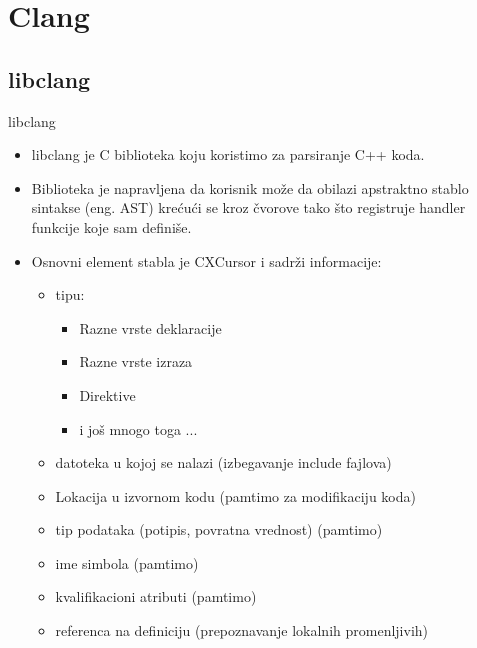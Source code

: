 \documentclass{beamer}
\begin{document}
\section{Clang}

\subsection{libclang}

\begin{frame}{libclang}

\begin{itemize}
  \item { libclang je C biblioteka koju koristimo za parsiranje C++
      koda.
  }
  \item { Biblioteka je napravljena da korisnik može da obilazi
    apstraktno stablo sintakse (eng. AST) krećući se kroz čvorove
    tako što registruje handler funkcije koje sam definiše.
  }
  \item { Osnovni element stabla je CXCursor i sadrži informacije:
      \begin{itemize}
        \item { tipu:
            \begin{itemize}
              \item {Razne vrste deklaracije}
              \item {Razne vrste  izraza}
              \item {Direktive}
              \item {i još mnogo toga ...}
            \end{itemize}
          }
        \item{ datoteka u kojoj se nalazi } (izbegavanje include fajlova)
      \item{ Lokacija u izvornom kodu } (pamtimo za modifikaciju koda)
      \item{ tip podataka (potipis, povratna vrednost) } (pamtimo)
      \item{ ime simbola } (pamtimo)
      \item{ kvalifikacioni atributi } (pamtimo)
      \item{ referenca na definiciju } (prepoznavanje lokalnih promenljivih)
      \end{itemize}

  }
\end{itemize}

\end{frame}
\end{document}
